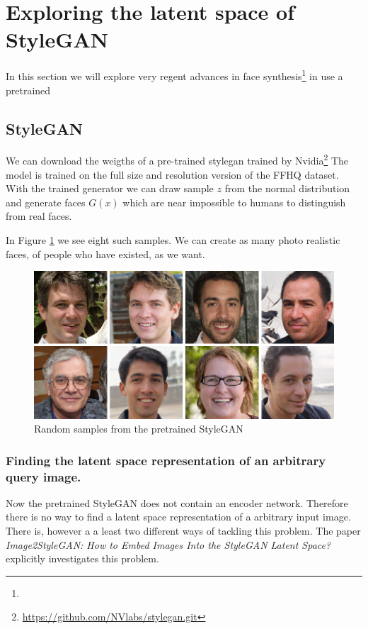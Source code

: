 
\section{Exploring the latent space of StyleGAN}
\label{stylegan}
In this section we will explore  very regent advances in face synthesis\footnote{} in use a pretrained

\subsection{StyleGAN}

We can download the weigths of a pre-trained stylegan trained by Nvidia\footnote{\url{https://github.com/NVlabs/stylegan.git}}\cite{stylegan}
The model is trained on the full size and resolution version of the FFHQ dataset.
With the trained generator we can draw sample $z$ from the normal distribution and generate faces $G(x)$ which are near impossible to humans to distinguish from real faces.

In Figure \ref{StyleGAN-examples} we see eight such samples. We can create as many photo realistic faces, of people who have existed, as we want.
\begin{figure}[h!]
  \includegraphics[width=\textwidth]{fig/stylegan/randomsamples}
  \caption{Random samples from the pretrained StyleGAN}
  \label{StyleGAN-examples}
\end{figure}




\subsubsection{Finding the latent space representation of an arbitrary query image.}
Now the pretrained StyleGAN does not contain an encoder network. Therefore there is no way to find a latent space representation of a arbitrary input image.
There is, however a a least two different ways of tackling this problem.
%
\cite{interfacegan}
The paper \textit{Image2StyleGAN: How to Embed Images Into the StyleGAN Latent Space?}\cite{Image2StyleGAN} explicitly investigates this problem.


